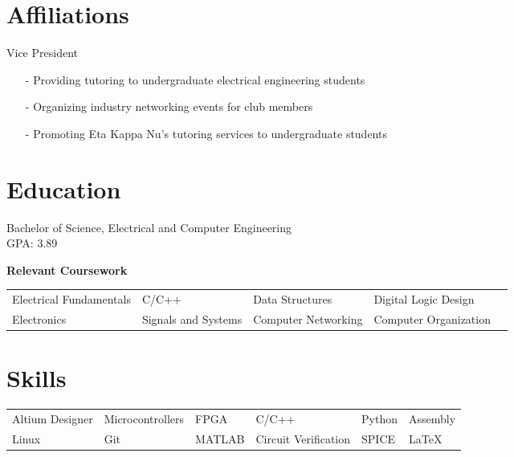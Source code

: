 \documentclass{my_cv}
\begin{document}
\section{Affiliations}

\vspace{-0.75em}
Vice President
\vspace{-0.5em}
\begin{itemize}
    \item[-] Providing tutoring to undergraduate electrical engineering students
    \vspace{-0.75em}
    
    \item[-] Organizing industry networking events for club members
    \vspace{-0.75em}
    
    \item[-] Promoting Eta Kappa Nu's tutoring services to undergraduate students
\end{itemize}


\section{Education}
\vspace{-0.75em}
Bachelor of Science, Electrical and Computer Engineering \\
GPA: 3.89

\vspace{1em}
    \noindent\textbf{Relevant Coursework}
    
    \noindent\begin{tabular}{@{}l l l l l}
         Electrical Fundamentals & C/C++ & Data Structures & Digital Logic Design\\ 
         Electronics & Signals and Systems & Computer Networking &  Computer Organization
    \end{tabular}





\section{Skills}

\noindent\begin{tabular}{@{}l l l l l l}
     Altium Designer & Microcontrollers & FPGA & C/C++ & Python &  Assembly\\
    Linux & Git & MATLAB & Circuit Verification & SPICE & \LaTeX\\
\end{tabular}
\end{document}
